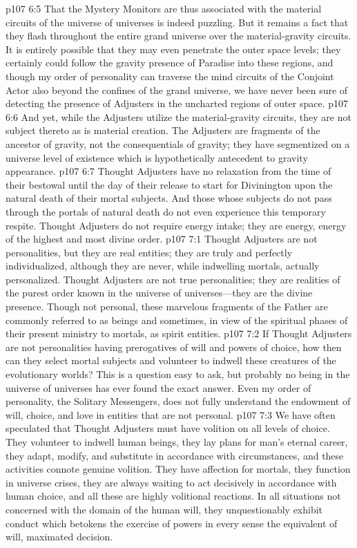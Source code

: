 \vs p107 6:5 That the Mystery Monitors are thus associated with the material circuits of the universe of universes is indeed puzzling. But it remains a fact that they flash throughout the entire grand universe over the material\hyp{}gravity circuits. It is entirely possible that they may even penetrate the outer space levels; they certainly could follow the gravity presence of Paradise into these regions, and though my order of personality can traverse the mind circuits of the Conjoint Actor also beyond the confines of the grand universe, we have never been sure of detecting the presence of Adjusters in the uncharted regions of outer space.
\vs p107 6:6 And yet, while the Adjusters utilize the material\hyp{}gravity circuits, they are not subject thereto as is material creation. The Adjusters are fragments of the ancestor of gravity, not the consequentials of gravity; they have segmentized on a universe level of existence which is hypothetically antecedent to gravity appearance.
\vs p107 6:7 Thought Adjusters have no relaxation from the time of their bestowal until the day of their release to start for Divinington upon the natural death of their mortal subjects. And those whose subjects do not pass through the portals of natural death do not even experience this temporary respite. Thought Adjusters do not require energy intake; they are energy, energy of the highest and most divine order.
\vs p107 7:1 Thought Adjusters are not personalities, but they are real entities; they are truly and perfectly individualized, although they are never, while indwelling mortals, actually personalized. Thought Adjusters are not true personalities; they are  realities of the purest order known in the universe of universes---they are the divine presence. Though not personal, these marvelous fragments of the Father are commonly referred to as beings and sometimes, in view of the spiritual phases of their present ministry to mortals, as spirit entities.
\vs p107 7:2 If Thought Adjusters are not personalities having prerogatives of will and powers of choice, how then can they select mortal subjects and volunteer to indwell these creatures of the evolutionary worlds? This is a question easy to ask, but probably no being in the universe of universes has ever found the exact answer. Even my order of personality, the Solitary Messengers, does not fully understand the endowment of will, choice, and love in entities that are not personal.
\vs p107 7:3 We have often speculated that Thought Adjusters must have volition on all  levels of choice. They volunteer to indwell human beings, they lay plans for man’s eternal career, they adapt, modify, and substitute in accordance with circumstances, and these activities connote genuine volition. They have affection for mortals, they function in universe crises, they are always waiting to act decisively in accordance with human choice, and all these are highly volitional reactions. In all situations not concerned with the domain of the human will, they unquestionably exhibit conduct which betokens the exercise of powers in every sense the equivalent of will, maximated decision.
